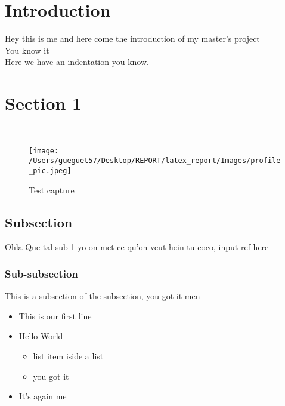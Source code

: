 \documentclass[hidelinks]{article}
\begin{document}

\setcounter{page}{1}

\section{Introduction}\label{sec:intro}
Hey this is me and here come the introduction of my master's project \\
You know it \\

Here we have an indentation you know.
\lipsum[1]





\newpage
\section{Section 1}
\lipsum[1] \\

\begin{figure}[H]
	\centering
	\texttt{[image: /Users/gueguet57/Desktop/REPORT/latex\_report/Images/profile\_pic.jpeg]}
	\caption[Optional caption]{Test capture} 
\end{figure}

\subsection{Subsection}
Ohla Que tal sub 1 yo on met ce qu'on veut hein tu coco, input ref here \cite{ref:ref_1}

\subsubsection{Sub-subsection}
This is a subsection of the subsection, you got it men \cite{ref:ref_2}

\begin{itemize}
	\item This is our first line
	\item Hello World
	\begin{itemize}
		\item list item iside a list
		\item you got it
	\end{itemize}
	\item It's again me
\end{itemize} 
\end{document}
